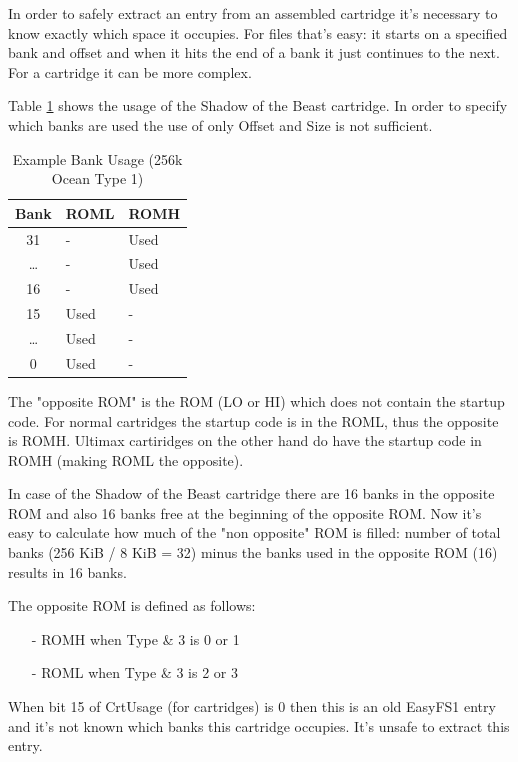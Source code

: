 \documentclass[a4paper,oneside]{memoir}
\begin{document}
In order to safely extract an entry from an assembled cartridge it's
necessary to know exactly which space it occupies. For files that's easy:
it starts on a specified bank and offset and when it hits the end of a bank
it just continues to the next. For a cartridge it can be more complex.

Table \ref{tab:bank-usage-oc1-256k} shows the usage of the Shadow of the Beast cartridge.
In order to specify which banks are used the use of only Offset and Size is not sufficient.

\begin{table}[!htbp]
    \centering
    \begin{tabularx}{0.6\textwidth}{c|X|X}
        \toprule
        Bank & ROML & ROMH \\
        \midrule
        31 & - & Used \\
        \ldots & - & Used \\
        16 & - & Used \\
        15 & Used & - \\
        \ldots & Used & - \\
        0 & Used & - \\
        \bottomrule
    \end{tabularx}
    \caption{Example Bank Usage (256k Ocean Type 1)}
    \label{tab:bank-usage-oc1-256k}
\end{table}

The "opposite ROM" is the ROM (LO or HI) which does not contain the startup code.
For normal cartridges the startup code is in the ROML, thus the opposite is ROMH.
Ultimax cartiridges on the other hand do have the startup code in ROMH
(making ROML the opposite).

In case of the Shadow of the Beast cartridge
there are 16 banks in the opposite ROM and also 16 banks free at the
beginning of the opposite ROM. Now it's easy to calculate how much of the
"non opposite" ROM is filled: number of total banks (256 KiB / 8 KiB = 32)
minus the banks used in the opposite ROM (16) results in 16 banks.

The opposite ROM is defined as follows:
\begin{itemize}
\item[-] ROMH when Type \& 3 is 0 or 1
\item[-] ROML when Type \& 3 is 2 or 3
\end{itemize}

When bit 15 of CrtUsage (for cartridges) is 0 then this is an old EasyFS1
entry and it's not known which banks this cartridge occupies.
It's unsafe to extract this entry.
\end{document}
